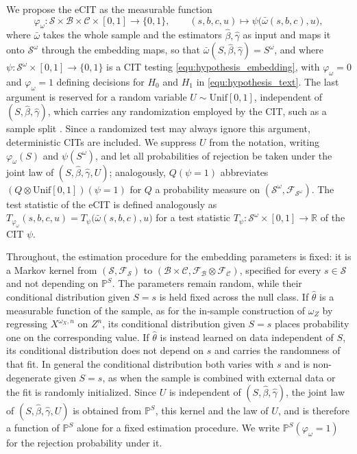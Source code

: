 \documentclass[twoside,11pt]{article}
\begin{document}
We propose the eCIT as the measurable function
\begin{equation}\label{eq:ecit}
\varphi_{\omega}:\mathcal{S}\times\mathcal{B}\times\mathcal{C}\times[0,1]\to\{0,1\},\qquad
(s,b,c,u)\mapsto\psi\bigl(\bar\omega(s,b,c),u\bigr),
\end{equation}
where $\bar\omega$ takes the whole sample and the estimators $\hat\beta,\hat\gamma$ as input and maps it onto $\mathcal{S}^{\omega}$ through the embedding maps, so that $\bar\omega(S,\hat\beta,\hat\gamma)=S^{\omega}$, and where $\psi:\mathcal{S}^{\omega}\times[0,1]\to\{0,1\}$ is a CIT testing \eqref{equ:hypothesis_embedding}, with $\varphi_{\omega}=0$ and $\varphi_{\omega}=1$ defining decisions for $H_0$ and $H_1$ in \eqref{equ:hypothesis_text}. 
The last argument is reserved for a random variable $U\sim\mathrm{Unif}[0,1]$, independent of $(S,\hat\beta,\hat\gamma)$, which carries any randomization employed by the CIT, such as a sample split \citep[cf. e.g.,][]{shah2020hardness}. 
Since a randomized test may always ignore this argument, deterministic CITs are included. 
We suppress $U$ from the notation, writing $\varphi_\omega(S)$ and $\psi(S^\omega)$, and let all probabilities of rejection be taken under the joint law of $(S,\hat\beta,\hat\gamma,U)$; analogously, $Q(\psi=1)$ abbreviates $(Q\otimes\mathrm{Unif}[0,1])(\psi=1)$ for $Q$ a probability measure on
$(\mathcal{S}^\omega,\mathcal{F}_{\mathcal{S}^\omega})$.
The test statistic of the eCIT is defined analogously as $T_{\varphi_\omega}(s,b,c,u)=T_{\psi}\bigl(\bar\omega(s,b,c),u\bigr)$ for a test statistic $T_{\psi}:\mathcal{S}^{\omega}\times[0,1]\to\mathbb{R}$ of the CIT $\psi$.

Throughout, the estimation procedure for the embedding parameters is fixed: it is a Markov kernel from $(\mathcal{S},\mathcal{F}_{\mathcal{S}})$ to $(\mathcal{B}\times\mathcal{C},\mathcal{F}_{\mathcal{B}}\otimes\mathcal{F}_{\mathcal{C}})$, specified for every $s\in\mathcal{S}$ and not depending on $\mathbb{P}^S$.
The parameters remain random, while their conditional distribution given $S=s$ is held fixed across the null class.
If $\hat\theta$ is a measurable function of the sample, as for the in-sample construction of $\omega_Z$ by regressing $X^{\omega_X,n}$ on $Z^n$, its conditional distribution given $S=s$ places probability one on the corresponding value. 
If $\hat\theta$ is instead learned on data independent of $S$, its conditional distribution does not depend on $s$ and carries the randomness of that fit. In general the conditional distribution both varies with $s$ and is non-degenerate given $S=s$, as when the sample is combined with external data or the fit is randomly initialized.
Since $U$ is independent of $(S,\hat\beta,\hat\gamma)$, the joint law of $(S,\hat\beta,\hat\gamma,U)$ is obtained from $\mathbb{P}^S$, this kernel and the law of $U$, and is therefore a function of $\mathbb{P}^S$ alone for a fixed estimation procedure. We write $\mathbb{P}^S(\varphi_\omega=1)$ for the rejection probability under it.
\end{document}
